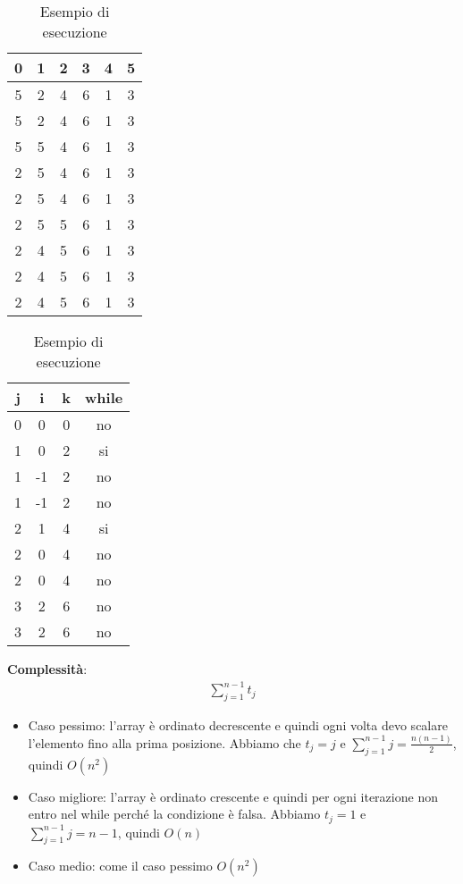 \begin{table}[h]
	\centering
	\begin{tabular}{ |c|c|c|c|c|c| }
		\hline
		0 & 1 & 2 & 3 & 4 & 5 \\
		\hline
		5 & 2 & 4 & 6 & 1 & 3 \\
		\hline 
		5 & 2 & 4 & 6 & 1 & 3 \\
		\hline 
		5 & 5 & 4 & 6 & 1 & 3 \\
		\hline 
		2 & 5 & 4 & 6 & 1 & 3 \\
		\hline 
		2 & 5 & 4 & 6 & 1 & 3 \\
		\hline 
		2 & 5 & 5 & 6 & 1 & 3 \\
		\hline 
		2 & 4 & 5 & 6 & 1 & 3 \\
		\hline 
		2 & 4 & 5 & 6 & 1 & 3 \\
		\hline 
		2 & 4 & 5 & 6 & 1 & 3 \\
		\hline 
	\end{tabular}
	\begin{tabular} { |c|c|c|c|}
		\hline
		j & i & k & while \\
		\hline
		0 & 0 & 0 & no \\
		\hline
		1 & 0 & 2 & si \\
		\hline
		1 & -1 & 2 & no \\
		\hline
		1 & -1 & 2 & no \\
		\hline
		2 & 1 & 4 & si \\
		\hline
		2 & 0 & 4 & no \\
		\hline
		2 & 0 & 4 & no \\
		\hline
		3 & 2 & 6 & no \\
		\hline
		3 & 2 & 6 & no \\
		\hline
	\end{tabular}
	\caption{Esempio di esecuzione}
\end{table}
\textbf{Complessità}:
\begin{align*}
	\sum\limits_{j=1}^{n-1} t_j
\end{align*}
\begin{itemize}
	\item Caso pessimo: l'array è ordinato decrescente e quindi ogni volta devo scalare l'elemento fino alla prima posizione. Abbiamo che $t_j = j$ e $\sum\limits_{j=1}^{n-1} j = \frac{n(n-1)}{2}$, quindi $O(n^2)$
	\item Caso migliore: l'array è ordinato crescente e quindi per ogni iterazione non entro nel while perché la condizione è falsa. Abbiamo $t_j = 1$ e $\sum\limits_{j=1}^{n-1} j = n-1$, quindi $O(n)$
	\item Caso medio: come il caso pessimo $O(n^2)$
\end{itemize}
